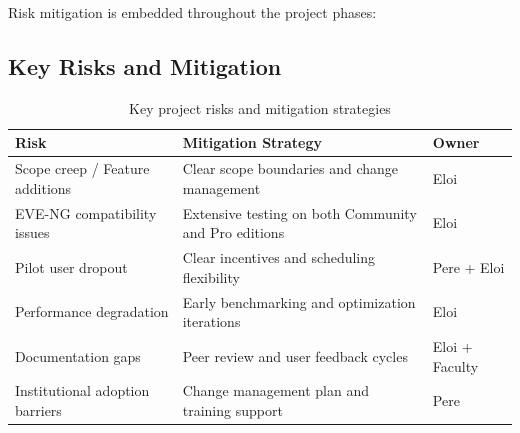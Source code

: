 Risk mitigation is embedded throughout the project phases:

\subsection{Key Risks and Mitigation}

\begin{table}[H]
\centering
\small
\begin{tabularx}{\textwidth}{|l|X|l|}
\hline
\textbf{Risk} & \textbf{Mitigation Strategy} & \textbf{Owner} \\
\hline
Scope creep / Feature additions & Clear scope boundaries and change management & Eloi \\
\hline
EVE-NG compatibility issues & Extensive testing on both Community and Pro editions & Eloi \\
\hline
Pilot user dropout & Clear incentives and scheduling flexibility & Pere + Eloi \\
\hline
Performance degradation & Early benchmarking and optimization iterations & Eloi \\
\hline
Documentation gaps & Peer review and user feedback cycles & Eloi + Faculty \\
\hline
Institutional adoption barriers & Change management plan and training support & Pere \\
\hline
\end{tabularx}
\caption{Key project risks and mitigation strategies}
\label{tab:risk_management}
\end{table}

